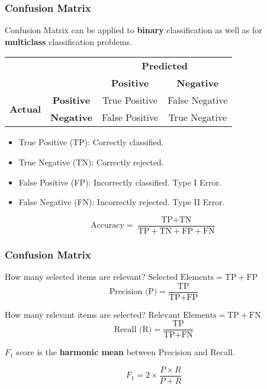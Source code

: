 \documentclass[aspectratio=169, 10pt]{beamer}
\begin{document}
\begin{frame}
    \frametitle{Confusion Matrix}
    
    Confusion Matrix can be applied to \textbf{binary} classification as well as for \textbf{multiclass} classification problems.
            
    \begin{table}[]
        \begin{tabular}{cccc}
                                         &                                        & \multicolumn{2}{c}{\textbf{Predicted}}                                    \\
                                         &                                        & \textbf{Positive}                   & \textbf{Negative}                   \\ \cline{3-4} 
        \multirow{2}{*}{\textbf{Actual}} & \multicolumn{1}{c|}{\textbf{Positive}} & \multicolumn{1}{c|}{\cellcolor{blue!25}True Positive}  & \multicolumn{1}{c|}{\cellcolor{red!25}False Negative} \\ \cline{3-4} 
                                         & \multicolumn{1}{c|}{\textbf{Negative}} & \multicolumn{1}{c|}{\cellcolor{red!25}False Positive} & \multicolumn{1}{c|}{\cellcolor{blue!25}True Negative}  \\ \cline{3-4} 
        \end{tabular}
    \end{table}

    \begin{itemize}
        \item True Positive (TP): Correctly classified.
        \item True Negative (TN): Correctly rejected.
        \item False Positive (FP): Incorrectly classified. Type I Error.
        \item False Negative (FN): Incorrectly rejected. Type II Error.
    \end{itemize}

    \[
        \text{Accuracy} = \frac{\text{TP} + \text{TN}}{\text{TP} + \text{TN} + \text{FP} + \text{FN}}
    \]

\end{frame}

\begin{frame}
    \frametitle{Confusion Matrix}

    How many selected items are relevant? $\text{Selected Elements} = \text{TP}+ \text{FP}$
    \[
        \text{Precision (P)} = \frac{\text{TP}}{\text{TP}+ \text{FP}}
    \]

    How many relevant items are selected? $\text{Relevant Elements} = \text{TP}+ \text{FN}$
    \[
        \text{Recall (R)} = \frac{\text{TP}}{\text{TP}+ \text{FN}}
    \]
    
    $F_1$ score is the \textbf{harmonic mean} between Precision and Recall.

    \[
        F_1 = 2 \times \frac{P \times R}{P + R}
    \]
    
\end{frame}
\end{document}
